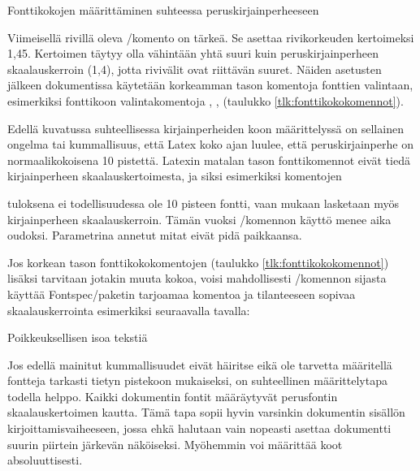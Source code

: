 \begin{esimerkki}
\caption{Fonttikokojen määrittäminen suhteessa peruskirjainperheeseen}
\label{esim:fontti_suhteellinen}
\end{esimerkki}

Viimeisellä rivillä oleva \-/komento on tärkeä.
Se asettaa rivikorkeuden kertoimeksi 1,45. Kertoimen täytyy olla
vähintään yhtä suuri kuin peruskirjainperheen skaalauskerroin (1,4),
jotta rivivälit ovat riittävän suuret. Näiden asetusten jälkeen
dokumentissa käytetään korkeamman tason komentoja fonttien valintaan,
esimerkiksi fonttikoon valintakomentoja ,
,  (taulukko
\ref{tlk:fonttikokokomennot}).

Edellä kuvatussa suhteellisessa kirjainperheiden koon määrittelyssä on
sellainen ongelma tai kummallisuus, että Latex koko ajan luulee, että
peruskirjainperhe on normaalikokoisena 10 pistettä. Latexin matalan
tason fonttikomennot eivät tiedä kirjainperheen skaalauskertoimesta, ja
siksi esimerkiksi komentojen

\begin{koodilohkosis}
  \fontsize{10pt}{12pt} \selectfont
\end{koodilohkosis}

tuloksena ei todellisuudessa ole 10 pisteen fontti, vaan mukaan
lasketaan myös kirjainperheen skaalauskerroin. Tämän vuoksi \-/komennon käyttö menee aika oudoksi. Parametrina annetut
mitat eivät pidä paikkaansa.

Jos korkean tason font\-ti\-koko\-komen\-to\-jen (taulukko
\ref{tlk:fonttikokokomennot}) lisäksi tarvitaan jotakin muuta kokoa,
voisi mahdollisesti \-/komennon sijasta käyttää
Fontspec\-/paketin tarjoamaa komentoa ja tilanteeseen sopivaa
skaalauskerrointa esimerkiksi seuraavalla tavalla:

\begin{koodilohkosis}
   Poikkeuksellisen isoa tekstiä
\end{koodilohkosis}

Jos edellä mainitut kummallisuudet eivät häiritse eikä ole tarvetta
määritellä fontteja tarkasti tietyn pistekoon mukaiseksi, on
suhteellinen määrittelytapa todella helppo. Kaikki dokumentin fontit
määräytyvät perusfontin skaalauskertoimen kautta. Tämä tapa sopii hyvin
varsinkin dokumentin sisällön kirjoittamisvaiheeseen, jossa ehkä
halutaan vain nopeasti asettaa dokumentti suurin piirtein järkevän
näköiseksi. Myöhemmin voi määrittää koot absoluuttisesti.

